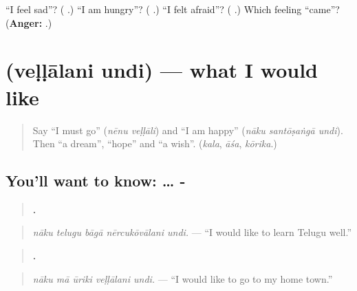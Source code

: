 \begin{tcolorbox}[breakable,colback=teal!4,colframe=teal!35!black,title={Before you move on}]
\textquotedblleft{}I feel sad\textquotedblright{}? (\textbf{  }.) \textquotedblleft{}I am hungry\textquotedblright{}? (\textbf{  }.) \textquotedblleft{}I felt afraid\textquotedblright{}? (\textbf{  }.) Which feeling \textquotedblleft{}came\textquotedblright{}? (\textbf{Anger:} \textbf{  }.)
\end{tcolorbox}
\section[\texorpdfstring{\te{వెళ్ళాలని} \te{ఉంది} (veḷḷālani undi)}{వెళ్ళాలని ఉంది (veḷḷālani undi)}]{  (veḷḷālani undi) — what I would like}

\label{lesson:TE-C322-vellalani-undi}



\begin{quote}
Say \textquotedblleft{}I must go\textquotedblright{} (\emph{nēnu veḷḷāli}) and \textquotedblleft{}I am happy\textquotedblright{} (\emph{nāku santōṣaṅgā undi}). Then \textquotedblleft{}a dream\textquotedblright{}, \textquotedblleft{}hope\textquotedblright{} and \textquotedblleft{}a wish\textquotedblright{}. (\emph{kala}, \emph{āśa}, \emph{kōrika}.)
\end{quote}

\subsection*{You'll want to know:  … - }
\begin{quote}
\textbf{    .}
\end{quote}

\begin{quote}
\emph{nāku telugu bāgā nērcukōvālani undi.} — \textquotedblleft{}I would like to learn Telugu well.\textquotedblright{}
\end{quote}

\begin{quote}
\textbf{    .}
\end{quote}

\begin{quote}
\emph{nāku mā ūriki veḷḷālani undi.} — \textquotedblleft{}I would like to go to my home town.\textquotedblright{}
\end{quote}

